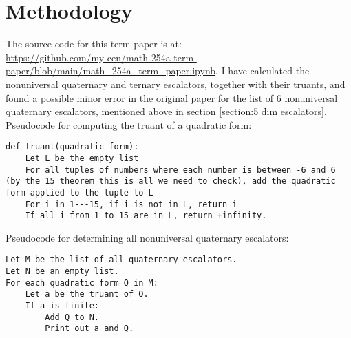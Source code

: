 \documentclass[letterpaper, 12pt]{article}
\begin{document}
\section{Methodology}
The source code for this term paper is at:\\\url{https://github.com/my-cen/math-254a-term-paper/blob/main/math_254a_term_paper.ipynb}.
I have calculated the nonuniversal quaternary and ternary escalators, together with their truants, and found a possible minor error in the original paper for the list of $6$ nonuniversal quaternary escalators, mentioned above in section \ref{section:5 dim escalators}. Pseudocode for computing the truant of a quadratic form:
\begin{verbatim}
def truant(quadratic form):
    Let L be the empty list
    For all tuples of numbers where each number is between -6 and 6 (by the 15 theorem this is all we need to check), add the quadratic form applied to the tuple to L
    For i in 1---15, if i is not in L, return i
    If all i from 1 to 15 are in L, return +infinity.
\end{verbatim}

Pseudocode for determining all nonuniversal quaternary escalators:
\begin{verbatim}
Let M be the list of all quaternary escalators.
Let N be an empty list.
For each quadratic form Q in M:
    Let a be the truant of Q.
    If a is finite:
        Add Q to N.
        Print out a and Q.
\end{verbatim}

\printbibliography
\end{document}
